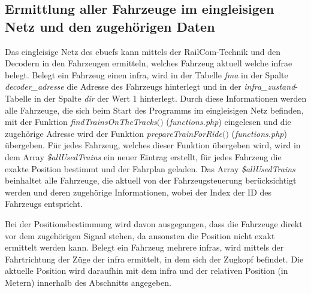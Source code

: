 \subsection{Ermittlung aller Fahrzeuge im eingleisigen Netz und den zugehörigen Daten} \label{main_2}
Das eingleisige Netz des \acp{ebuef} kann mittels der RailCom-Technik und den Decodern in den Fahrzeugen ermitteln, welches Fahrzeug aktuell welche \ac{infra}e belegt. Belegt ein Fahrzeug einen \ac{infra}, wird in der Tabelle \textit{fma} in der Spalte \textit{decoder\_adresse} die Adresse des Fahrzeugs hinterlegt und in der \textit{infra\_zustand}-Tabelle in der Spalte \textit{dir} der Wert 1 hinterlegt. Durch diese Informationen werden alle Fahrzeuge, die sich beim Start des Programms im eingleisigen Netz befinden, mit der Funktion \textit{find\-Trains\-On\-The\-Tracks$($$)$} (\textit{functions.php}) eingelesen und die zugehörige Adresse wird der Funktion \textit{prepare\-Train\-For\-Ride$($$)$} (\textit{functions.php}) übergeben. Für jedes Fahrzeug, welches dieser Funktion übergeben wird, wird in dem Array \textit{\$allUsedTrains} ein neuer Eintrag erstellt, für jedes Fahrzeug die exakte Position bestimmt und der Fahrplan geladen. Das Array \textit{\$all\-Used\-Trains} beinhaltet alle Fahrzeuge, die aktuell von der Fahrzeugsteuerung berücksichtigt werden und deren zugehörige Informationen, wobei der Index der ID des Fahrzeugs entspricht. 

Bei der Positionsbestimmung wird davon ausgegangen, dass die Fahrzeuge direkt vor dem zugehörigen Signal stehen, da ansonsten die Position nicht exakt ermittelt werden kann. Belegt ein Fahrzeug mehrere \acp{infra}, wird mittels der Fahrtrichtung der Züge der \ac{infra} ermittelt, in dem sich der Zugkopf befindet. Die aktuelle Position wird daraufhin mit dem \ac{infra} und der relativen Position (in Metern) innerhalb des Abschnitts angegeben.

